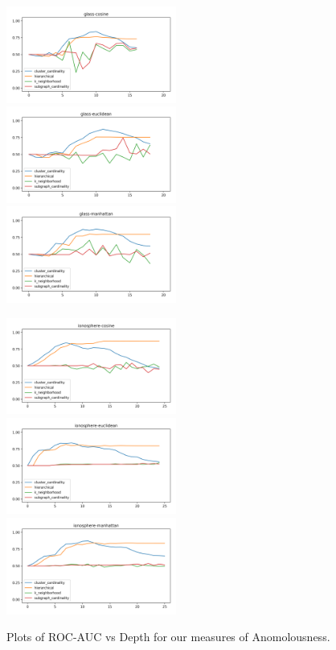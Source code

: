 \begin{figure}[!t]
\includegraphics[width=2.2in]{kdd/static/auc_vs_depth/glass-cosine.png}
\includegraphics[width=2.2in]{kdd/static/auc_vs_depth/glass-euclidean.png}
\includegraphics[width=2.2in]{kdd/static/auc_vs_depth/glass-manhattan.png}

\includegraphics[width=2.2in]{kdd/static/auc_vs_depth/ionosphere-cosine.png}
\includegraphics[width=2.2in]{kdd/static/auc_vs_depth/ionosphere-euclidean.png}
\includegraphics[width=2.2in]{kdd/static/auc_vs_depth/ionosphere-manhattan.png}

\caption{
Plots of ROC-AUC vs Depth for our measures of Anomolousness.
}

\label{results:datasets_1}
\end{figure}

